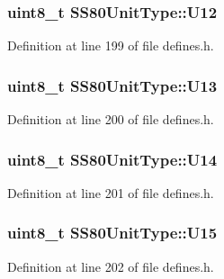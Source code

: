 \subsubsection[{\texorpdfstring{U12}{U12}}]{\setlength{\rightskip}{0pt plus 5cm}uint8\+\_\+t S\+S80\+Unit\+Type\+::\+U12}\hypertarget{structSS80UnitType_a03dbef211d4dfa850c9795ca4e60a104}{}\label{structSS80UnitType_a03dbef211d4dfa850c9795ca4e60a104}


Definition at line 199 of file defines.\+h.

\subsubsection[{\texorpdfstring{U13}{U13}}]{\setlength{\rightskip}{0pt plus 5cm}uint8\+\_\+t S\+S80\+Unit\+Type\+::\+U13}\hypertarget{structSS80UnitType_ac890c3734ea6988e504d71491d48f804}{}\label{structSS80UnitType_ac890c3734ea6988e504d71491d48f804}


Definition at line 200 of file defines.\+h.

\subsubsection[{\texorpdfstring{U14}{U14}}]{\setlength{\rightskip}{0pt plus 5cm}uint8\+\_\+t S\+S80\+Unit\+Type\+::\+U14}\hypertarget{structSS80UnitType_a885f26cbcfaf7b80ce64f069401fad7d}{}\label{structSS80UnitType_a885f26cbcfaf7b80ce64f069401fad7d}


Definition at line 201 of file defines.\+h.

\subsubsection[{\texorpdfstring{U15}{U15}}]{\setlength{\rightskip}{0pt plus 5cm}uint8\+\_\+t S\+S80\+Unit\+Type\+::\+U15}\hypertarget{structSS80UnitType_a088eee3da613c988c4f81c2ec57818de}{}\label{structSS80UnitType_a088eee3da613c988c4f81c2ec57818de}


Definition at line 202 of file defines.\+h.


